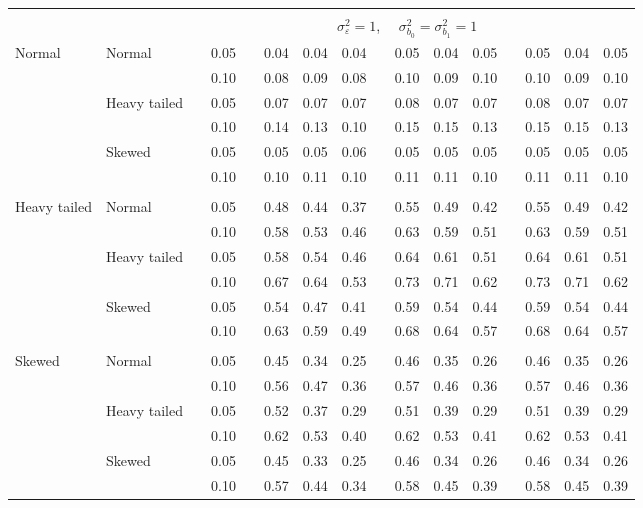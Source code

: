 \documentclass{article} %
\begin{document}
\begin{table}[ht]
\begin{scriptsize}
\begin{center}
\begin{tabular}{ll p{.1cm} c p{.1cm} rrr p{.1cm} rrr p{.1cm} rrr}
&&&&&&&&&&&&&&&\\
& && && \multicolumn{9}{c}{$\sigma_{\varepsilon}^2 = 1$, \ \ $\sigma_{b_0}^2 = \sigma_{b_1}^2 = 1$} \\ \cline{6-16}
\rowcolor{gray!20}Normal       & Normal       && 0.05 &&   0.04 & 0.04 & 0.04 && 0.05 & 0.04 & 0.05 && 0.05 & 0.04 & 0.05 \\ 
\rowcolor{gray!20}             &              && 0.10 &&   0.08 & 0.09 & 0.08 && 0.10 & 0.09 & 0.10 && 0.10 & 0.09 & 0.10 \\ 
\rowcolor{gray!20}             & Heavy tailed && 0.05 &&   0.07 & 0.07 & 0.07 && 0.08 & 0.07 & 0.07 && 0.08 & 0.07 & 0.07 \\ 
\rowcolor{gray!20}             &              && 0.10 &&   0.14 & 0.13 & 0.10 && 0.15 & 0.15 & 0.13 && 0.15 & 0.15 & 0.13 \\ 
\rowcolor{gray!20}             & Skewed       && 0.05 &&   0.05 & 0.05 & 0.06 && 0.05 & 0.05 & 0.05 && 0.05 & 0.05 & 0.05 \\ 
\rowcolor{gray!20}             &              && 0.10 &&   0.10 & 0.11 & 0.10 && 0.11 & 0.11 & 0.10 && 0.11 & 0.11 & 0.10 \\ 
             &&&&&&&&&&&&&&&\\
Heavy tailed & Normal       && 0.05 &&   0.48 & 0.44 & 0.37 && 0.55 & 0.49 & 0.42 && 0.55 & 0.49 & 0.42 \\ 
             &              && 0.10 &&   0.58 & 0.53 & 0.46 && 0.63 & 0.59 & 0.51 && 0.63 & 0.59 & 0.51 \\ 
             & Heavy tailed && 0.05 &&   0.58 & 0.54 & 0.46 && 0.64 & 0.61 & 0.51 && 0.64 & 0.61 & 0.51 \\ 
             &              && 0.10 &&   0.67 & 0.64 & 0.53 && 0.73 & 0.71 & 0.62 && 0.73 & 0.71 & 0.62 \\ 
             & Skewed       && 0.05 &&   0.54 & 0.47 & 0.41 && 0.59 & 0.54 & 0.44 && 0.59 & 0.54 & 0.44 \\ 
             &              && 0.10 &&   0.63 & 0.59 & 0.49 && 0.68 & 0.64 & 0.57 && 0.68 & 0.64 & 0.57 \\ 
             &&&&&&&&&&&&&&&\\
Skewed       & Normal       && 0.05 &&   0.45 & 0.34 & 0.25 && 0.46 & 0.35 & 0.26 && 0.46 & 0.35 & 0.26 \\ 
             &              && 0.10 &&   0.56 & 0.47 & 0.36 && 0.57 & 0.46 & 0.36 && 0.57 & 0.46 & 0.36 \\ 
             & Heavy tailed && 0.05 &&   0.52 & 0.37 & 0.29 && 0.51 & 0.39 & 0.29 && 0.51 & 0.39 & 0.29 \\ 
             &              && 0.10 &&   0.62 & 0.53 & 0.40 && 0.62 & 0.53 & 0.41 && 0.62 & 0.53 & 0.41 \\ 
             & Skewed       && 0.05 &&   0.45 & 0.33 & 0.25 && 0.46 & 0.34 & 0.26 && 0.46 & 0.34 & 0.26 \\ 
             &              && 0.10 &&   0.57 & 0.44 & 0.34 && 0.58 & 0.45 & 0.39 && 0.58 & 0.45 & 0.39 \\ 



\end{tabular}
\end{center}
\end{scriptsize}
\end{table}
\end{document}
